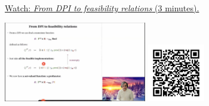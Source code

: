 
\begin{minipage}{10cm}
    \href{https://act4e-spring21.netlify.app/videos/spring2021-profunctors:from-dpi-to-feas.html}{Watch: \emph{From DPI to feasibility relations} (3 minutes).}
        
    \href{https://act4e-spring21.netlify.app/videos/spring2021-profunctors:from-dpi-to-feas.html}{\includegraphics[height=3.5cm]{spring2021-profunctors:from-dpi-to-feas/thumbnails.jpg}}
    \href{https://act4e-spring21.netlify.app/videos/spring2021-profunctors:from-dpi-to-feas.html}{\includegraphics[height=2.5cm]{spring2021-profunctors:from-dpi-to-feas/qrcode.png}}
\end{minipage}
